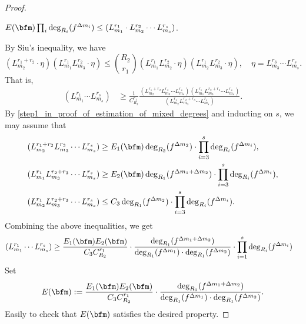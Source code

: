 \begin{proof}
    \begin{step}
      $ E(\bfm) \prod_i \deg_{R_i}(f^{\Delta m_i}) \leq (L_{m_1}^{r_1} \cdot L_{m_2}^{r_2} \cdots L_{m_s}^{r_s})$.
    \end{step}
    By Siu's inequality, we have
    \[ (L_{m_{2}}^{r_{1}+r_2} \cdot \eta) (L_{m_1}^{r_1} L_{m_{3}}^{r_{2}} \cdot \eta) \leq \binom{R_2}{r_{1}} (L_{m_1}^{r_1} L_{m_{2}}^{r_{2}} \cdot \eta) (L_{m_{2}}^{r_{1}} L_{m_{3}}^{r_{2}} \cdot \eta), \quad \eta = L_{m_3}^{r_3} \cdots L_{m_s}^{r_s}. \]
    That is,
    \begin{align*}
      (L_{m_1}^{r_1} \cdots L_{m_s}^{r_s}) & \geq \frac{1}{C_{R_2}^{r_1}} \frac{(L_{m_2}^{r_1+r_2} L_{m_3}^{r_3} \cdots L_{m_s}^{r_s}) (L_{m_1}^{r_1} L_{m_{3}}^{r_{2} + r_3} \cdots L_{m_s}^{r_s})}{(L_{m_2}^{r_1} L_{m_{3}}^{r_{2} + r_3} \cdots L_{m_s}^{r_s})}.
    \end{align*} 
    By \cref{step1_in_proof_of_estimation_of_mixed_degrees} and inducting on $s$, we may assume that 
    \begin{align*}
      (L_{m_2}^{r_1+r_2} L_{m_3}^{r_3} \cdots L_{m_s}^{r_s}) & \geq E_1(\bfm) \deg_{R_2}(f^{\Delta m_2}) \cdot \prod_{i=3}^{s} \deg_{R_i}(f^{\Delta m_i}), \\
      (L_{m_1}^{r_1} L_{m_{3}}^{r_{2} + r_3} \cdots L_{m_s}^{r_s}) & \geq E_2(\bfm) \deg_{R_1}(f^{\Delta m_1 + \Delta m_2}) \cdot \prod_{i=3}^{s} \deg_{R_i}(f^{\Delta m_i}), \\
      (L_{m_2}^{r_1} L_{m_{3}}^{r_{2} + r_3} \cdots L_{m_s}^{r_s}) & \leq C_3 \deg_{R_1}(f^{\Delta m_2}) \cdot \prod_{i=3}^{s} \deg_{R_i}(f^{\Delta m_i}).
    \end{align*}
    Combining the above inequalities, we get
    \begin{align*}
      (L_{m_1}^{r_1} \cdots L_{m_s}^{r_s}) 
      & \geq 
      \frac{E_1(\bfm) E_2(\bfm)}{C_3 C_{R_2}^{r_1}}
      \cdot \frac{\deg_{R_{1}}(f^{\Delta m_{1} + \Delta m_{2}})}{\deg_{R_{1}}(f^{\Delta m_{1}}) \cdot \deg_{R_{1}}(f^{\Delta m_{2}})}
      \cdot \prod_{i=1}^{s} \deg_{R_i}(f^{\Delta m_i}) 
    \end{align*}
    Set 
    \[ E(\bfm) := \frac{E_1(\bfm) E_2(\bfm)}{C_3 C_{R_2}^{r_1}} \cdot \frac{\deg_{R_{1}}(f^{\Delta m_{1} + \Delta m_{2}})}{\deg_{R_{1}}(f^{\Delta m_{1}}) \cdot \deg_{R_{1}}(f^{\Delta m_{2}})}. \]
    Easily to check that $E(\bfm)$ satisfies the desired property.
  \end{proof}

